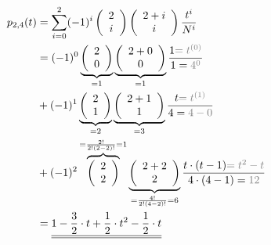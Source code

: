 $$
\begin{aligned}
p_{2, 4}(t)&=\sum_{i=0}^2(-1)^i\left(\begin{array}{c}
2 \\
i
\end{array}\right)\left(\begin{array}{c}
2+i \\
i
\end{array}\right) \frac{t^{i}}{N^{i}} \\
&=(-1)^0\underbrace{\left(\begin{array}{c}
2 \\
0
\end{array}\right)}_{=1}\underbrace{\left(\begin{array}{c}
2+0 \\
0
\end{array}\right)}_{=1} \frac{1\textcolor{gray}{=t^{(0)}}}{1=\textcolor{gray}{4^0}}\\&+
(-1)^1\underbrace{\left(\begin{array}{c}
2 \\
1
\end{array}\right)}_{=2}\underbrace{\left(\begin{array}{c}
2+1 \\
1
\end{array}\right)}_{=3} \frac{t\textcolor{gray}{=t^{(1)}}}{4=\textcolor{gray}{4-0}}\\&+
(-1)^2\overbrace{\left(\begin{array}{c}
2 \\
2
\end{array}\right)}^{=\frac{2 !}{2 !(2-2) !}=1}\underbrace{\left(\begin{array}{c}
2+2 \\
2
\end{array}\right)}_{=\frac{4 !}{2 !(4-2) !}=6} \frac{t\cdot(t-1)\textcolor{gray}{=t^2-t}}{4 \cdot (4-1)=\textcolor{gray}{12}}\\ &=\underline{\underline{1-\frac{3}{2}\cdot t+\frac{1}{2}\cdot t^2-\frac{1}{2}\cdot t}}
\end{aligned}
$$













